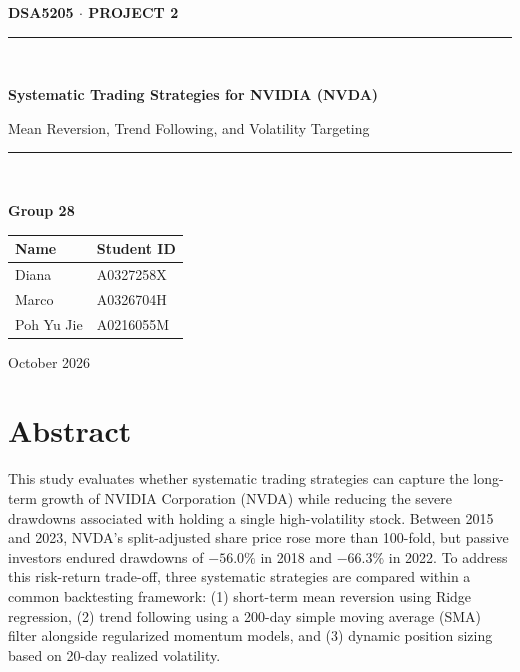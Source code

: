 \documentclass[11pt, a4paper]{article}
\begin{document}
\begin{titlepage}
\centering
\vspace*{1.0in}
{\large\bfseries DSA5205 $\cdot$ PROJECT 2\par}
\vspace{0.35in}
\rule{\linewidth}{0.8pt}\\[0.25in]
{\LARGE\bfseries Systematic Trading Strategies for NVIDIA (NVDA)\par}
\vspace{0.12in}
{\Large Mean Reversion, Trend Following, and Volatility Targeting\par}
\vspace{0.22in}
\rule{\linewidth}{0.8pt}\\[0.55in]

{\Large\bfseries Group 28\par}
\vspace{0.25in}

\begin{table}[H]
\centering
\normalsize
\renewcommand{\arraystretch}{1.25}
\begin{tabular}{l l}
\toprule
\textbf{Name} & \textbf{Student ID} \\
\midrule
Diana & A0327258X \\
Marco & A0326704H \\
Poh Yu Jie & A0216055M \\
\bottomrule
\end{tabular}
\end{table}

\vfill
{\normalsize October 2026\par}
\end{titlepage}

\newpage
\tableofcontents
\newpage

\section*{Abstract}

This study evaluates whether systematic trading strategies can capture the long-term growth of NVIDIA Corporation (NVDA) while reducing the severe drawdowns associated with holding a single high-volatility stock. Between 2015 and 2023, NVDA's split-adjusted share price rose more than 100-fold, but passive investors endured drawdowns of $-56.0\%$ in 2018 and $-66.3\%$ in 2022. To address this risk-return trade-off, three systematic strategies are compared within a common backtesting framework: (1) short-term mean reversion using Ridge regression, (2) trend following using a 200-day simple moving average (SMA) filter alongside regularized momentum models, and (3) dynamic position sizing based on 20-day realized volatility.
\end{document}
